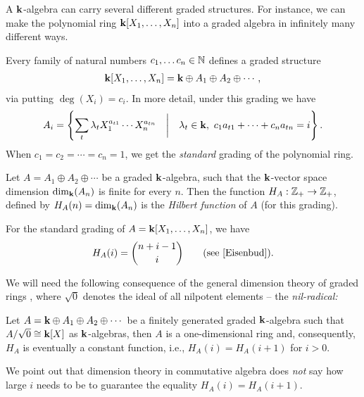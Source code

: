 A $\mathbf{k}$-algebra can carry several different graded structures. For instance, we can make the polynomial ring $\mathbf{k}[X_1,\ldots,X_n]$ into a graded algebra in infinitely many different ways.
\begin{example}\label{graded_algebra}
Every family of natural numbers $c_1,\ldots c_n\in\mathbb N$ defines a graded structure
\begin{align*}
\mathbf{k}[X_1,\ldots,X_n]=\mathbf{k}\oplus A_1\oplus A_2\oplus\cdots,
\end{align*}
via putting $\deg(X_i)=c_i$. In more detail, under this grading we have
\begin{align*}
A_i=\left\{\sum_t\lambda_tX_1^{a_{t1}}\cdots X_n^{a_{tn}}\quad \bigg|\quad \lambda_t \in \mathbf{k}, \ c_1a_{t1}+\cdots+c_na_{tn}=i\right\}.
\end{align*}
When $c_1=c_2=\cdots=c_n=1$, we get the \emph{standard} grading of the polynomial ring.
\end{example}

Let $A=A_1\oplus A_2\oplus\cdots$ be a graded $\mathbf{k}$-algebra, such that the $\mathbf{k}$-vector space dimension $\dim_{\mathbf{k}}(A_n)$ is finite for every $n$. Then the function $H_A:\mathbb Z_+\to\mathbb Z_+$, defined by $H_A(n)=\dim_{\mathbf{k}}(A_n)$ is the \emph{Hilbert function} of $A$ (for this grading).

\begin{example}
For the standard grading of $A=\mathbf{k}[X_1,\ldots,X_n]$, we have 
\begin{align*}
H_A(i) = \binom{n + i - 1}{i} \qquad \text{(see \cite[p. 45]{Eisenbud})}.
\end{align*}
\end{example}

We will need the following consequence of the general dimension theory of graded rings \cite[Chapter 11]{Atiyah}, where $\sqrt{0}$ denotes the ideal of all nilpotent elements -- the \emph{nil-radical:}

\begin{lemma}\label{dimension1}
Let $A=\mathbf{k}\oplus A_1 \oplus A_2\oplus\cdots$ be a finitely generated graded $\mathbf{k}$-algebra such that $A/\sqrt{0}\cong\mathbf{k}[X]$ as $\mathbf{k}$-algebras, then $A$ is a one-dimensional ring and, consequently, $H_A$ is eventually a constant function, i.e., $H_A(i)=H_A(i+1)$ for $i > 0$.
\end{lemma}

\begin{remark}\label{why_interesting}
We point out that dimension theory in commutative algebra does \emph{not} say how large $i$ needs to be to guarantee the equality $H_A(i)=H_A(i+1)$.
\end{remark}

